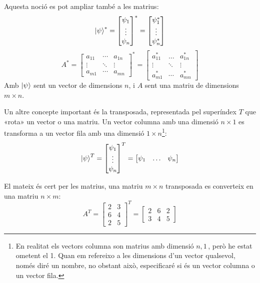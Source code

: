 Aquesta noció es pot ampliar també a les matrius:
$$
\ket{\psi}^{*} = 
	\begin{bmatrix} \psi_{1} \\ \vdots \\ \psi_{n} \end{bmatrix}^* = \begin{bmatrix} \psi_{1}^* \\ \vdots \\ \psi_{n}^* \end{bmatrix}
$$
$$
A^{*} = 
	\begin{bmatrix} 
	a_{11} & \cdots & a_{1n}\\ 
	\vdots & \ddots & \vdots \\ 
	a_{m1} & \cdots & a_{mn}
\end{bmatrix}^* 
= \begin{bmatrix} 
	a_{11}^* & \dots & a_{1n}^*\\ 
	\vdots & \ddots & \vdots \\ 
	a_{m1}^* & \cdots & a_{mn}^*
\end{bmatrix}
$$
Amb $\ket{\psi}$ sent un vector de dimensions $n$, i $A$ sent una matriu de dimensions $m \times n$.

Un altre concepte important és la transposada, representada pel superíndex $T$ que «rota» un vector o una matriu. Un vector columna amb una dimensió $n\times 1$ es transforma a un vector fila amb una dimensió $1\times n$\footnote{En realitat els vectors columna son matrius amb dimensió $n,1\,$, però he estat ometent el 1. Quan em refereixo a les dimensions d'un vector qualsevol, només diré un nombre, no obstant això, especificaré si és un vector columna o un vector fila.}:
$$
\ket{\psi}^{T} = 
	\begin{bmatrix} \psi_{1} \\ \vdots \\ \psi_{n} \end{bmatrix}^T = \begin{bmatrix} \psi_{1} & \dots & \psi_{n} \end{bmatrix}
$$

El mateix és cert per les matrius, una matriu $m\times n$ transposada es converteix en una matriu $n \times m$:
$$
A^T = \begin{bmatrix}
	 2 & 3 \\
	 6 & 4 \\
	 2 & 5 
\end{bmatrix}^T = \begin{bmatrix}
 2 & 6 & 2 \\
 3 & 4 & 5
\end{bmatrix}
$$

